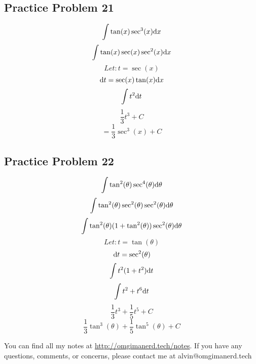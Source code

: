 \documentclass{math}
\begin{document}
\subsection*{Practice Problem 21}
\[ \int{\tan(x)\sec^{3}(x)\mathrm{d}{x}} \]
\[ \int{\tan(x)\sec(x)\sec^{2}(x)\mathrm{d}{x}} \]
\[ Let: t = \sec(x) \]
\[ \mathrm{d}{t} = \sec(x)\tan(x)\mathrm{d}{x} \]
\[ \int{t^{2}\mathrm{d}{t}} \]
\[ \frac{1}{3}t^{3}+C \]
\[ = \frac{1}{3}\sec^{3}(x)+C \]

\subsection*{Practice Problem 22}
\[ \int{\tan^{2}(\theta)\sec^{4}(\theta)\mathrm{d}{\theta}} \]
\[ \int{\tan^{2}(\theta)\sec^{2}(\theta)\sec^{2}(\theta)\mathrm{d}{\theta}} \]
\[ \int{\tan^{2}(\theta)(1+\tan^{2}(\theta))\sec^{2}(\theta)\mathrm{d}{\theta}} \]
\[ Let: t = \tan(\theta) \]
\[ \mathrm{d}{t} = \sec^{2}(\theta) \]
\[ \int{t^{2}(1+t^{2})\mathrm{d}{t}} \]
\[ \int{t^{2}+t^{6}\mathrm{d}{t}} \]
\[ \frac{1}{3}t^{3}+\frac{1}{5}t^{5}+C \]
\[ \frac{1}{3}\tan^{3}(\theta)+\frac{1}{5}\tan^{5}(\theta)+C \]

\begin{center}
  You can find all my notes at \url{http://omgimanerd.tech/notes}. If you have
  any questions, comments, or concerns, please contact me at
  alvin@omgimanerd.tech
\end{center}
\end{document}
